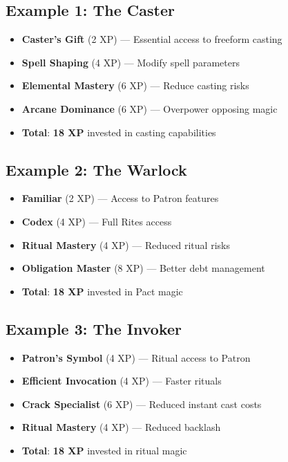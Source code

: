 \subsection*{Example 1: The Caster}
\begin{itemize}
\item \textbf{Caster's Gift} (2 XP) --- Essential access to freeform casting
\item \textbf{Spell Shaping} (4 XP) --- Modify spell parameters
\item \textbf{Elemental Mastery} (6 XP) --- Reduce casting risks
\item \textbf{Arcane Dominance} (6 XP) --- Overpower opposing magic
\item \textbf{Total}: \textbf{18 XP} invested in casting capabilities
\end{itemize}

\subsection*{Example 2: The Warlock}
\begin{itemize}
\item \textbf{Familiar} (2 XP) --- Access to Patron features
\item \textbf{Codex} (4 XP) --- Full Rites access
\item \textbf{Ritual Mastery} (4 XP) --- Reduced ritual risks
\item \textbf{Obligation Master} (8 XP) --- Better debt management
\item \textbf{Total}: \textbf{18 XP} invested in Pact magic
\end{itemize}

\subsection*{Example 3: The Invoker}
\begin{itemize}
\item \textbf{Patron's Symbol} (4 XP) --- Ritual access to Patron
\item \textbf{Efficient Invocation} (4 XP) --- Faster rituals
\item \textbf{Crack Specialist} (6 XP) --- Reduced instant cast costs
\item \textbf{Ritual Mastery} (4 XP) --- Reduced backlash
\item \textbf{Total}: \textbf{18 XP} invested in ritual magic
\end{itemize}


